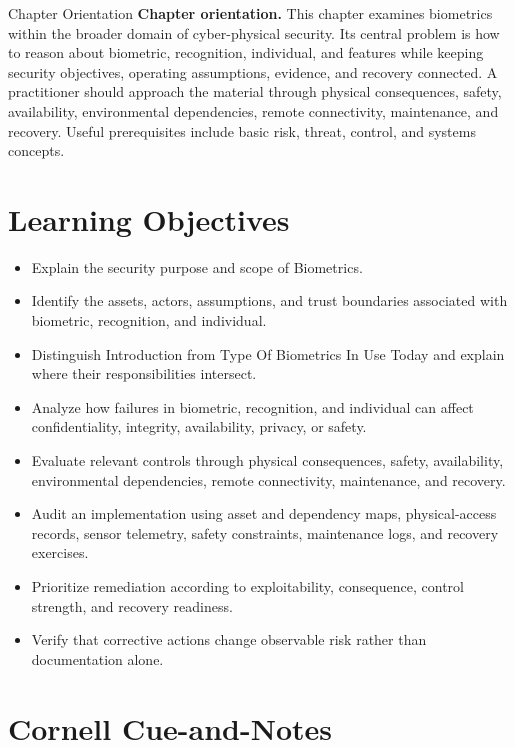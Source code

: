 \documentclass[11pt,letterpaper]{article}
\title{\CornellDocumentTitle}
\author{}
\date{}
\begin{document}
\maketitle
\begin{CornellOverviewBox}{Chapter Orientation}
\textbf{Chapter orientation.} This chapter examines biometrics within the broader domain of cyber-physical security. Its central problem is how to reason about biometric, recognition, individual, and features while keeping security objectives, operating assumptions, evidence, and recovery connected. A practitioner should approach the material through physical consequences, safety, availability, environmental dependencies, remote connectivity, maintenance, and recovery. Useful prerequisites include basic risk, threat, control, and systems concepts.
\end{CornellOverviewBox}
\section*{Learning Objectives}
\begin{itemize}
\item Explain the security purpose and scope of Biometrics.
\item Identify the assets, actors, assumptions, and trust boundaries associated with biometric, recognition, and individual.
\item Distinguish Introduction from Type Of Biometrics In Use Today and explain where their responsibilities intersect.
\item Analyze how failures in biometric, recognition, and individual can affect confidentiality, integrity, availability, privacy, or safety.
\item Evaluate relevant controls through physical consequences, safety, availability, environmental dependencies, remote connectivity, maintenance, and recovery.
\item Audit an implementation using asset and dependency maps, physical-access records, sensor telemetry, safety constraints, maintenance logs, and recovery exercises.
\item Prioritize remediation according to exploitability, consequence, control strength, and recovery readiness.
\item Verify that corrective actions change observable risk rather than documentation alone.
\end{itemize}
\section*{Cornell Cue-and-Notes}
\end{document}

